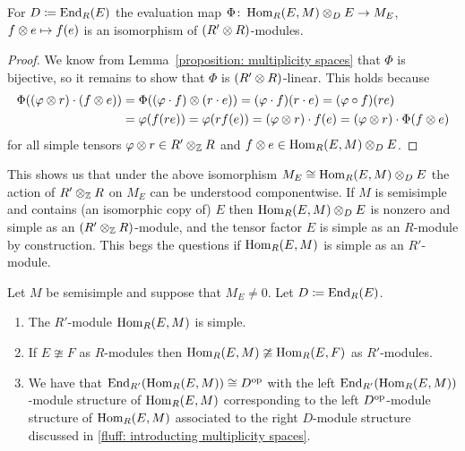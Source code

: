 \begin{lemma}
  For $D \coloneqq \operatorname{End}_R(E)$ the evaluation map $\Phi \colon \operatorname{Hom}_R(E,M) \mathbin{\otimes}_D E \to M_E$, $f \mathbin{\otimes} e \mapsto f(e)$ is an isomorphism of $(R' \mathbin{\otimes} R)$-modules.
\end{lemma}


\begin{proof}
  We know from Lemma~\ref{proposition: multiplicity spaces} that $\Phi$ is bijective, so it remains to show that $\Phi$ is $(R' \mathbin{\otimes} R)$-linear.
  This holds because
  \begin{align*}
        \Phi((\varphi \mathbin{\otimes} r) \cdot (f \mathbin{\otimes} e))
    &=  \Phi((\varphi \cdot f) \mathbin{\otimes} (r \cdot e))
     =  (\varphi \cdot f)(r \cdot e)
     =  (\varphi \circ f)(re) \\
    &=  \varphi(f(re))
     =  \varphi(rf(e))
     =  (\varphi \mathbin{\otimes} r) \cdot f(e)
     =  (\varphi \mathbin{\otimes} r) \cdot \Phi(f \mathbin{\otimes} e)
  \end{align*}
  for all simple tensors $\varphi \mathbin{\otimes} r \in R' \mathbin{\otimes}_{\mathbb{Z}} R$ and $f \mathbin{\otimes} e \in \operatorname{Hom}_R(E,M) \mathbin{\otimes}_D E$.
\end{proof}


\begin{fluff}
  This shows us that under the above isomorphism $M_E \cong \operatorname{Hom}_R(E,M) \mathbin{\otimes}_D E$ the action of $R' \mathbin{\otimes}_{\mathbb{Z}} R$ on $M_E$ can be understood componentwise.
  If $M$ is semisimple and contains (an isomorphic copy of) $E$ then $\operatorname{Hom}_R(E,M) \mathbin{\otimes}_D E$ is nonzero and simple as an $(R' \mathbin{\otimes}_{\mathbb{Z}} R)$-module, and the tensor factor $E$ is simple as an $R$-module by construction.
  This begs the questions if $\operatorname{Hom}_R(E,M)$ is simple as an $R'$-module.
\end{fluff}


\begin{lemma}
  Let $M$ be semisimple and suppose that $M_E \neq 0$.
  Let $D \coloneqq \operatorname{End}_R(E)$.
  \begin{enumerate}
    \item
      The $R'$-module $\operatorname{Hom}_R(E,M)$ is simple.
    \item
      If $E \ncong F$ as $R$-modules then $\operatorname{Hom}_R(E,M) \ncong \operatorname{Hom}_R(E,F)$ as $R'$-modules.
    \item
      We have that $\operatorname{End}_{R'}( \operatorname{Hom}_R(E,M) ) \cong D^{\operatorname{op}}$ with the left $\operatorname{End}_{R'}( \operatorname{Hom}_R(E,M) )$-module structure of $\operatorname{Hom}_R(E,M)$ corresponding to the left $D^{\operatorname{op}}$-module structure of $\operatorname{Hom}_R(E,M)$ associated to the right $D$-module structure discussed in \ref{fluff: introducting multiplicity spaces}.
  \end{enumerate}
\end{lemma}


